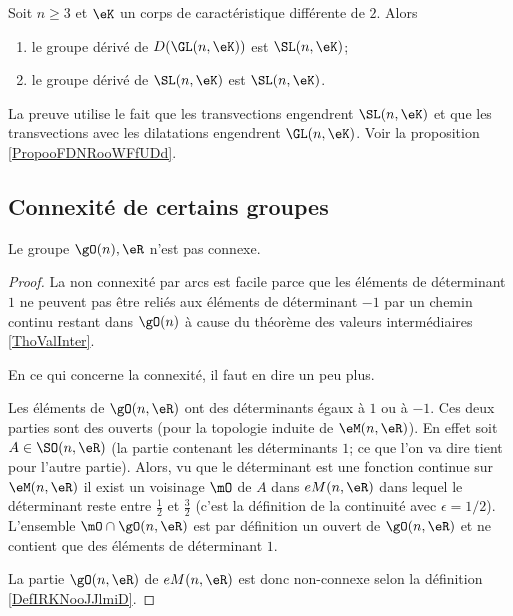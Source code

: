 \begin{proposition}
    Soit \( n\geq 3\) et \( \eK\) un corps de caractéristique différente de \( 2\). Alors
    \begin{enumerate}
        \item
            le groupe dérivé de \( D(\GL(n,\eK))\) est \(\SL(n,\eK)\);  
        \item
            le groupe dérivé de \( \SL(n,\eK)\) est \( \SL(n,\eK)\).
    \end{enumerate}
\end{proposition}
La preuve utilise le fait que les transvections engendrent \( \SL(n,\eK)\) et que les transvections avec les dilatations engendrent \( \GL(n,\eK)\). Voir la proposition \ref{PropooFDNRooWFfUDd}.

\subsection{Connexité  de certains groupes}

\begin{lemma}           \label{LEMooIPOVooZJyNoH}
    Le groupe \( \gO(n),\eR\) n'est pas connexe.
\end{lemma}

\begin{proof}
    La non connexité par arcs est facile parce que les éléments de déterminant \( 1\) ne peuvent pas être reliés aux éléments de déterminant \( -1\) par un chemin continu restant dans \( \gO(n)\) à cause du théorème des valeurs intermédiaires \ref{ThoValInter}.

    En ce qui concerne la connexité, il faut en dire un peu plus.

    Les éléments de \( \gO(n,\eR)\) ont des déterminants égaux à \( 1\) ou à \( -1\). Ces deux parties sont des ouverts (pour la topologie induite de \( \eM(n,\eR)\)). En effet soit \( A\in\SO(n,\eR)\) (la partie contenant les déterminants \( 1\); ce que l'on va dire tient pour l'autre partie). Alors, vu que le déterminant est une fonction continue sur \( \eM(n,\eR)\) il exist un voisinage \( \mO\) de \( A\) dans \( \\eM(n,\eR)\) dans lequel le déterminant reste entre \( \frac{ 1 }{2}\) et \( \frac{ 3 }{2}\) (c'est la définition de la continuité avec \( \epsilon=1/2\)). L'ensemble \( \mO\cap\gO(n,\eR)\) est par définition un ouvert de \( \gO(n,\eR)\) et ne contient que des éléments de déterminant \( 1\).

    La partie \( \gO(n,\eR)\) de \( \\eM(n,\eR)\) est donc non-connexe selon la définition \ref{DefIRKNooJJlmiD}.
\end{proof}

